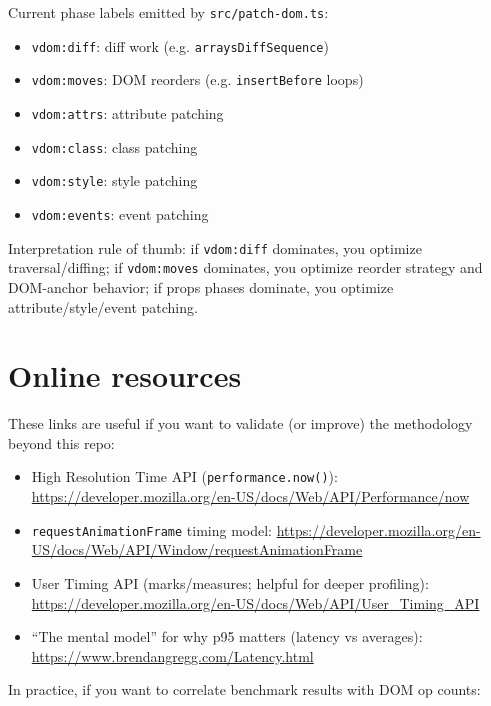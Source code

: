 Current phase labels emitted by \texttt{src/patch-dom.ts}:

\begin{itemize}
\item \texttt{vdom:diff}: diff work (e.g. \texttt{arraysDiffSequence})
\item \texttt{vdom:moves}: DOM reorders (e.g. \texttt{insertBefore} loops)
\item \texttt{vdom:attrs}: attribute patching
\item \texttt{vdom:class}: class patching
\item \texttt{vdom:style}: style patching
\item \texttt{vdom:events}: event patching
\end{itemize}

Interpretation rule of thumb: if \texttt{vdom:diff} dominates, you optimize traversal/diffing; if \texttt{vdom:moves} dominates, you optimize reorder strategy and DOM-anchor behavior; if props phases dominate, you optimize attribute/style/event patching.

\section{Online resources}

These links are useful if you want to validate (or improve) the methodology beyond this repo:

\begin{itemize}
\item High Resolution Time API (\texttt{performance.now()}):
\href{https://developer.mozilla.org/en-US/docs/Web/API/Performance/now}{https://developer.mozilla.org/en-US/docs/Web/API/Performance/now}
\item \texttt{requestAnimationFrame} timing model:
\href{https://developer.mozilla.org/en-US/docs/Web/API/Window/requestAnimationFrame}{https://developer.mozilla.org/en-US/docs/Web/API/Window/requestAnimationFrame}
\item User Timing API (marks/measures; helpful for deeper profiling):
\href{https://developer.mozilla.org/en-US/docs/Web/API/User\_Timing\_API}{https://developer.mozilla.org/en-US/docs/Web/API/User\_Timing\_API}
\item ``The mental model'' for why p95 matters (latency vs averages):
\href{https://www.brendangregg.com/Latency.html}{https://www.brendangregg.com/Latency.html}
\end{itemize}

In practice, if you want to correlate benchmark results with DOM op counts:


